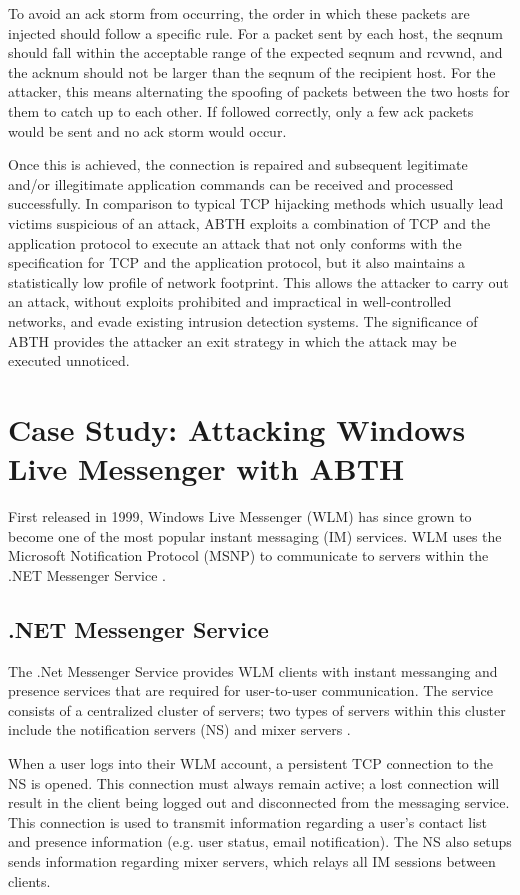 \documentclass{sig-alternate}
\begin{document}
To avoid an ack storm from occurring, the order in which these packets are injected should follow a specific rule. For a packet sent by each host, the seqnum should fall within the acceptable range of the expected seqnum and rcvwnd, and the acknum should not be larger than the seqnum of the recipient host. For the attacker, this means alternating the spoofing of packets between the two hosts for them to catch up to each other. If followed correctly, only a few ack packets would be sent and no ack storm would occur.

Once this is achieved, the connection is repaired and subsequent legitimate and/or illegitimate application commands can be received and processed successfully. In comparison to typical TCP hijacking methods which usually lead victims suspicious of an attack, ABTH exploits a combination of TCP and the application protocol to execute an attack that not only conforms with the specification for TCP and the application protocol, but it also maintains a statistically low profile of network footprint. This allows the attacker to carry out an attack, without exploits prohibited and impractical in well-controlled networks, and evade existing intrusion detection systems.
The significance of ABTH provides the attacker an exit strategy in which the attack may be executed unnoticed.

\section{Case Study: Attacking Windows Live Messenger with ABTH}

First released in 1999, Windows Live Messenger (WLM) has since grown to become one of the most popular instant messaging (IM) services. WLM uses the Microsoft Notification Protocol (MSNP) to communicate to servers within the .NET Messenger Service \cite{piccard:imsecurity}.

\subsection{.NET Messenger Service}

The .Net Messenger Service provides WLM clients with instant messanging and presence services that are required for user-to-user communication. The service consists of a centralized cluster of servers; two types of servers within this cluster include the notification servers (NS) and mixer servers \cite{torre:wlm}.

When a user logs into their WLM account, a persistent TCP connection to the NS is opened. This connection must always remain active; a lost connection will result in the client being logged out and disconnected from the messaging service. 
This connection is used to transmit information regarding a user's contact list and presence information (e.g. user status, email notification).
The NS also setups sends information regarding mixer servers, which relays all IM sessions between clients. 
\end{document}
